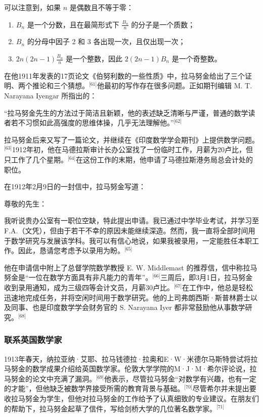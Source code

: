 可以注意到，如果 $n$ 是偶数且不等于零：
\begin{enumerate}
\item $B_n$ 是一个分数，且在最简形式下 $\frac{B_n}{n}$ 的分子是一个质数；
\item $B_n$ 的分母中因子 2 和 3 各出现一次，且仅出现一次；
\item $2n(2n - 1)\frac{B_n}{n}$ 是一个整数，因此 $2(2n - 1)B_n$ 是一个奇整数。
\end{enumerate}
在他1911年发表的17页论文《伯努利数的一些性质》中，拉马努金给出了三个证明、两个推论和三个猜想。\(^\text{[61]}\)他最初的写作存在很多问题。正如期刊编辑 M. T. Narayana Iyengar 所指出的：

“拉马努金先生的方法过于简洁且新颖，他的表述缺乏清晰与严谨，普通的数学读者若不习惯如此高强度的思维体操，几乎无法理解他。”\(^\text{[62]}\)

拉马努金后来又写了一篇论文，并继续在《印度数学学会期刊》上提供数学问题。\(^\text{[63]}\)1912年初，他在马德拉斯审计长办公室找了一份临时工作，月薪为20卢比，但只工作了几个星期。\(^\text{[64]}\)在这份工作的末期，他申请了马德拉斯港务局总会计处的职位。

在1912年2月9日的一封信中，拉马努金写道：

尊敬的先生：

我听说贵办公室有一职位空缺，特此提出申请。我已通过中学毕业考试，并学习至F.A.（文凭），但由于若干不幸的原因未能继续深造。然而，我一直将全部时间用于数学研究与发展该学科。我可以有信心地说，如果我被录用，一定能胜任本职工作。因此，恳请您考虑予以录用为盼。\(^\text{[65]}\)

他在申请信中附上了总督学院数学教授 E. W. Middlemast 的推荐信，信中称拉马努金是“一位在数学方面具有非凡能力的青年”。\(^\text{[66]}\)三周后，即3月1日，拉马努金收到录用通知，成为三级四等会计文员，月薪30卢比。\(^\text{[67]}\)在工作中，他总是轻松迅速地完成任务，并将空闲时间用于数学研究。他的上司弗朗西斯·斯普林爵士以及同事、也是印度数学学会财务官的 S. Narayana Iyer 都非常鼓励他从事数学研究。\(^\text{[68]}\)
\subsubsection{联系英国数学家}
1913年春天，纳拉亚纳·艾耶、拉马钱德拉·拉奥和E·W·米德尔马斯特尝试将拉马努金的数学成果介绍给英国数学家。伦敦大学学院的M·J·M·希尔评论说，拉马努金的论文中充满了漏洞。\(^\text{[69]}\)他表示，尽管拉马努金“对数学有兴趣，也有一定的才能”，但他缺乏被数学界接受所需的教育背景与基础。\(^\text{[70]}\)尽管希尔并未提出要收拉马努金为学生，但他对拉马努金的工作给予了认真细致的专业建议。在朋友们的帮助下，拉马努金起草了信件，写给剑桥大学的几位著名数学家。\(^\text{[71]}\)

